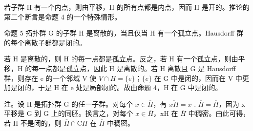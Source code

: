 若子群 H 有一个内点，则由平移，H 的所有点都是内点，因而 H 是开的。推论的第二个断言是命题 4 的一个特殊情形。

命题 5 拓扑群 G 的子群 H 是离散的，当且仅当 H 有一个孤立点。Hausdorff 群的每个离散子群都是闭的。

若 H 是离散的，则 H 的每一点都是孤立点。反之，若 H 有一个孤立点，则由平移，H 的每一点都是孤立点，因此 H 是离散的。若 H 离散且 G 是 Hausdorff 群，则存在 e 的一个邻域 V 使 \(V \cap H = \{e\}\)；\(\{e\}\) 在 G 中是闭的，因而在 V 中更加是闭的，于是 H 在 e 处是局部闭的。故由命题 4，H 在 G 中是闭的。

注。设 H 是拓扑群 G 的任一子群。对每个 \(x \in \overline{H}\)，有 \(\overline{xH} = x\) . \(\overline{H} = \overline{H}\)，因为 x 平移是 G 到 G 上的同胚。换言之，对每个 \(x \in \overline{H}\)，xH 在 \(\overline{H}\) 中稠密。由此可得，若 H 不是闭的，则 \(\overline{H} \cap \mathrm{C}H\) 在 \(\overline{H}\) 中稠密。

